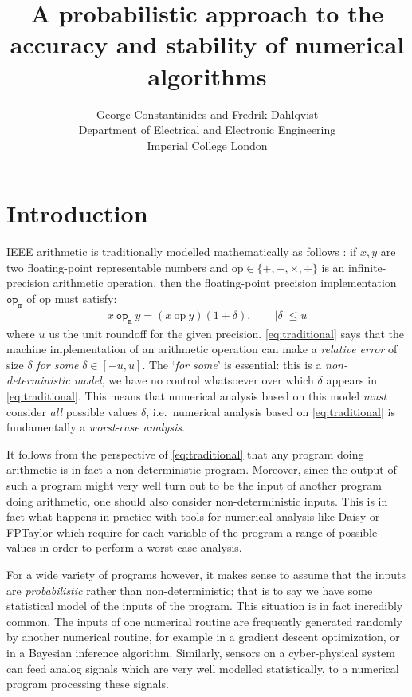 \documentclass[10pt,conference]{IEEEtran}
\title{A probabilistic approach to the accuracy and stability of numerical algorithms}
\author{George Constantinides and Fredrik Dahlqvist \\ Department of Electrical and Electronic Engineering\\ Imperial College London}
\newcommand{\ie}{i.e.\ }
\newcommand{\absv}[1]{\vert #1\vert}
\newcommand{\mop}{\mathtt{op_m}}
\newcommand{\iop}{\mathrm{op}}
\begin{document}
\maketitle

\begin{abstract}

\end{abstract}

\section{Introduction}

IEEE arithmetic \cite{ieee754} is traditionally modelled mathematically as follows \cite{higham2002accuracy}: if $x,y$ are two floating-point representable numbers and $\iop\in\{+,-,\times,\div\}$ is an infinite-precision arithmetic operation, then the floating-point precision implementation $\mop$ of $\iop$ must satisfy:
\begin{align}
x~\mop~y=(x~\iop~y)(1+\delta), \qquad\absv{\delta}\leq u\label{eq:traditional}
\end{align}
where $u$ us the unit roundoff for the given precision. \cref{eq:traditional} says that the machine implementation of an arithmetic operation can make a \emph{relative error} of size $\delta$ \emph{for some} $\delta\in\left[-u,u\right]$. The `\emph{for some}' is essential: this is a \emph{non-deterministic model}, we have no control whatsoever over which $\delta$ appears in \cref{eq:traditional}. This means that numerical analysis based on this model \emph{must} consider \emph{all} possible values $\delta$, \ie numerical analysis based on \cref{eq:traditional} is fundamentally a \emph{worst-case analysis}. 

It follows from the perspective of \cref{eq:traditional} that any program doing arithmetic is in fact a non-deterministic program. Moreover, since the output of such a program might very well turn out to be the input of another program doing arithmetic, one should also consider non-deterministic inputs. This is in fact what happens in practice with tools for numerical analysis like Daisy \cite{darulova2018daisy} or FPTaylor \cite{solovyev2018rigorous} which require for each variable of the program  a range of possible values in order to perform a worst-case analysis.

For a wide variety of programs however, it makes sense to assume that the inputs are \emph{probabilistic} rather than non-deterministic; that is to say we have some statistical model of the inputs of the program. This situation is in fact incredibly common. The inputs of one numerical routine are frequently generated randomly by another numerical routine, for example in a gradient descent optimization, or in a Bayesian inference algorithm. Similarly, sensors on a cyber-physical system can feed analog signals which are very well modelled statistically, to a numerical program processing these signals. 
\end{document}
